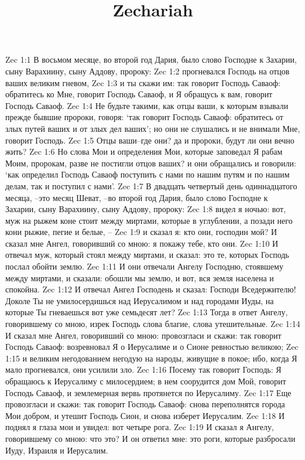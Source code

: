 

\title{Zechariah}

Zec 1:1  В восьмом месяце, во второй год Дария, было слово Господне к Захарии, сыну Варахиину, сыну Аддову, пророку:
Zec 1:2  прогневался Господь на отцов ваших великим гневом,
Zec 1:3  и ты скажи им: так говорит Господь Саваоф: обратитесь ко Мне, говорит Господь Саваоф, и Я обращусь к вам, говорит Господь Саваоф.
Zec 1:4  Не будьте такими, как отцы ваши, к которым взывали прежде бывшие пророки, говоря: `так говорит Господь Саваоф: обратитесь от злых путей ваших и от злых дел ваших'; но они не слушались и не внимали Мне, говорит Господь.
Zec 1:5  Отцы ваши--где они? да и пророки, будут ли они вечно жить?
Zec 1:6  Но слова Мои и определения Мои, которые заповедал Я рабам Моим, пророкам, разве не постигли отцов ваших? и они обращались и говорили: `как определил Господь Саваоф поступить с нами по нашим путям и по нашим делам, так и поступил с нами'.
Zec 1:7  В двадцать четвертый день одиннадцатого месяца, --это месяц Шеват, --во второй год Дария, было слово Господне к Захарии, сыну Варахиину, сыну Аддову, пророку:
Zec 1:8  видел я ночью: вот, муж на рыжем коне стоит между миртами, которые в углублении, а позади него кони рыжие, пегие и белые, --
Zec 1:9  и сказал я: кто они, господин мой? И сказал мне Ангел, говоривший со мною: я покажу тебе, кто они.
Zec 1:10  И отвечал муж, который стоял между миртами, и сказал: это те, которых Господь послал обойти землю.
Zec 1:11  И они отвечали Ангелу Господню, стоявшему между миртами, и сказали: обошли мы землю, и вот, вся земля населена и спокойна.
Zec 1:12  И отвечал Ангел Господень и сказал: Господи Вседержителю! Доколе Ты не умилосердишься над Иерусалимом и над городами Иуды, на которые Ты гневаешься вот уже семьдесят лет?
Zec 1:13  Тогда в ответ Ангелу, говорившему со мною, изрек Господь слова благие, слова утешительные.
Zec 1:14  И сказал мне Ангел, говоривший со мною: провозгласи и скажи: так говорит Господь Саваоф: возревновал Я о Иерусалиме и о Сионе ревностью великою;
Zec 1:15  и великим негодованием негодую на народы, живущие в покое; ибо, когда Я мало прогневался, они усилили зло.
Zec 1:16  Посему так говорит Господь: Я обращаюсь к Иерусалиму с милосердием; в нем соорудится дом Мой, говорит Господь Саваоф, и землемерная вервь протянется по Иерусалиму.
Zec 1:17  Еще провозгласи и скажи: так говорит Господь Саваоф: снова переполнятся города Мои добром, и утешит Господь Сион, и снова изберет Иерусалим.
Zec 1:18  И поднял я глаза мои и увидел: вот четыре рога.
Zec 1:19  И сказал я Ангелу, говорившему со мною: что это? И он ответил мне: это роги, которые разбросали Иуду, Израиля и Иерусалим.
